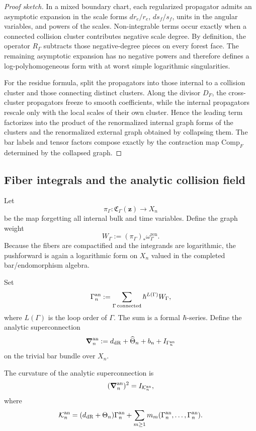 \begin{proof}[Proof sketch]
In a mixed boundary chart, each regularized propagator admits an asymptotic expansion in the scale forms $dr_e/r_e$, $ds_f/s_f$, units in the angular variables, and powers of the scales. Non-integrable terms occur exactly when a connected collision cluster contributes negative scale degree. By definition, the operator $R_\Gamma$ subtracts those negative-degree pieces on every forest face. The remaining asymptotic expansion has no negative powers and therefore defines a log-polyhomogeneous form with at worst simple logarithmic singularities.

For the residue formula, split the propagators into those internal to a collision cluster and those connecting distinct clusters. Along the divisor $D_F$, the cross-cluster propagators freeze to smooth coefficients, while the internal propagators rescale only with the local scales of their own cluster. Hence the leading term factorizes into the product of the renormalized internal graph forms of the clusters and the renormalized external graph obtained by collapsing them. The bar labels and tensor factors compose exactly by the contraction map $\mathrm{Comp}_F$ determined by the collapsed graph.
\end{proof}

\subsection{Fiber integrals and the analytic collision field}
Let
\[
 \pi_\Gamma : \mathfrak C_\Gamma(\mathbf z) \longrightarrow X_n
\]
be the map forgetting all internal bulk and time variables. Define the graph weight
\[
 W_\Gamma := (\pi_\Gamma)_*\omega_\Gamma^{\mathrm{ren}}.
\]
Because the fibers are compactified and the integrands are logarithmic, the pushforward is again a logarithmic form on $X_n$ valued in the completed bar/endomorphism algebra.

Set
\[
 \Gamma_n^{\mathrm{an}} := \sum_{\Gamma\,\mathrm{connected}} \hbar^{L(\Gamma)}W_\Gamma,
\]
where $L(\Gamma)$ is the loop order of $\Gamma$. The sum is a formal $\hbar$-series. Define the analytic superconnection
\[
 \boldsymbol{\nabla}_n^{\mathrm{an}} := d_{\mathrm{dR}}+\widehat\Theta_n+b_n+I_{\Gamma_n^{\mathrm{an}}}
\]
on the trivial bar bundle over $X_n$.

\begin{theorem}%
The curvature of the analytic superconnection is
\[
 (\boldsymbol{\nabla}_n^{\mathrm{an}})^2 = I_{\mathcal K_n^{\mathrm{an}}},
\]
where
\[
 \mathcal K_n^{\mathrm{an}}
 =
 (d_{\mathrm{dR}}+\Theta_n)\Gamma_n^{\mathrm{an}}
 +
 \sum_{m\ge 1}m_m(\Gamma_n^{\mathrm{an}},\dots,\Gamma_n^{\mathrm{an}}).
\]
\end{theorem}

